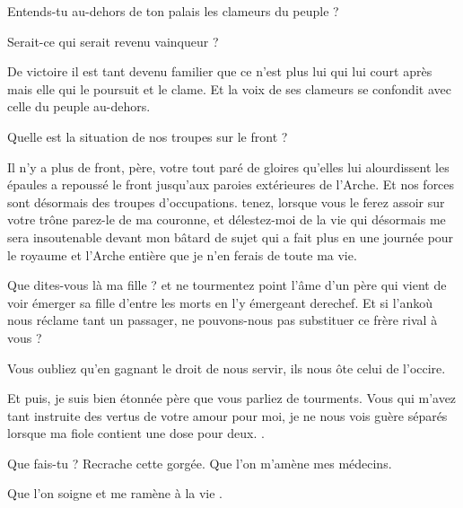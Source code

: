 \begin{drama}
  \elaspeaks Entends-tu au-dehors de ton palais les clameurs du peuple ?

  \roispeaks Serait-ce \elena qui serait revenu vainqueur ?

  \elaspeaks De victoire il est tant devenu familier que ce n’est plus lui qui lui court après mais elle qui le poursuit et le clame. Et la voix de ses clameurs se confondit avec celle du peuple au-dehors.

  \roispeaks Quelle est la situation de nos troupes sur le front ?

  \elaspeaks Il n’y a plus de front, père, votre \elena tout paré de gloires qu’elles lui alourdissent les épaules a repoussé le front jusqu’aux paroies extérieures de l’Arche. Et nos forces sont désormais des troupes d’occupations.  tenez, lorsque vous le ferez assoir sur votre trône parez-le de ma couronne, et délestez-moi de la vie qui désormais me sera insoutenable devant mon bâtard de sujet qui a fait plus en une journée pour le royaume et l’Arche entière que je n’en ferais de toute ma vie.

  \roispeaks Que dites-vous là ma fille ? et ne tourmentez point l’âme d’un père qui vient de voir émerger sa fille d’entre les morts en l’y émergeant derechef. Et si l’ankoù nous réclame tant un passager, ne pouvons-nous pas substituer ce frère rival à vous ?

  \elaspeaks Vous oubliez qu’en gagnant le droit de nous servir, ils nous ôte celui de l’occire.

  Et puis, je suis bien étonnée père que vous parliez de tourments. Vous qui m’avez tant instruite des vertus de votre amour pour moi, je ne nous vois guère séparés lorsque ma fiole contient une dose pour deux. .

  \roispeaks Que fais-tu \princesse{} ? Recrache cette gorgée.  Que l’on m’amène mes médecins.


  \roispeaks Que l’on soigne et me ramène à la vie \princesse.





\end{drama}
